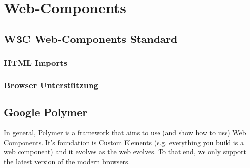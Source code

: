 \section{Web-Components}
\label{sec:3_Web_Components}





\subsection{W3C Web-Components Standard}
\label{sec:3_W3C}














\subsubsection{HTML Imports}
\label{sec:3_WC_Imports}

\subsubsection{Browser Unterstützung}
\label{sec:3_WC_Support}

\subsection{Google Polymer}
\label{sec:3_Polymer}




\iffalse
In general, Polymer is a framework that aims to use (and show how to use) Web Components. It's foundation is Custom Elements (e.g. everything you build is a web component) and it evolves as the web evolves. To that end, we only support the latest version of the modern browsers.

